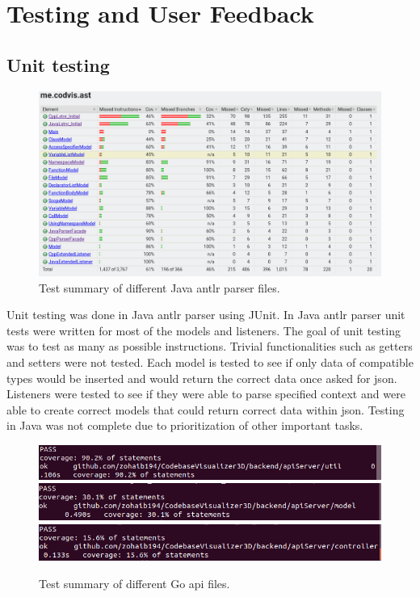 \chapter{Testing and User Feedback}
\label{chap:testing}

\section{Unit testing}

\begin{figure}[h!] 
    \includegraphics[width=\textwidth]{inc/images/test/JavaTests.png}
    \caption{Test summary of different Java \gls{antlr}  parser files.}
    \label{fig:testJava}
\end{figure}


Unit testing was done in Java \gls{antlr} parser using JUnit. In Java \gls{antlr} parser unit tests were written for most of the models and listeners. 
The goal of unit testing was to test as many as possible instructions. Trivial functionalities such as getters and setters were not tested.
Each model is tested to see if only data of compatible types would be inserted and would return the correct data once asked for \gls{json}. Listeners were tested to see if they were able to parse specified context and were able to create correct models that could return correct data within \gls{json}. Testing in Java was not complete due to prioritization of other important tasks. 

\begin{figure}[H] 
    \includegraphics[width=\textwidth]{inc/images/test/apiServer_testCoverage_util.png}
    \includegraphics[width=\textwidth]{inc/images/test/apiServer_testCoverage_model.png}
    \includegraphics[width=\textwidth]{inc/images/test/apiServer_testCoverage_controller.png}
    \caption{Test summary of different Go \gls{api} files.}
    \label{fig:testGO}
\end{figure}


